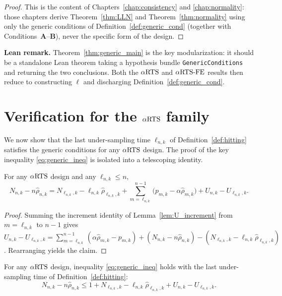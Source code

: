 \begin{proof}
This is the content of Chapters~\ref{chap:consistency} and \ref{chap:normality}:
those chapters derive Theorem~\ref{thm:LLN} and Theorem~\ref{thm:normality}
using only the generic conditions of Definition~\ref{def:generic_cond} (together
with Conditions~\textbf{A}--\textbf{B}), never the specific form of the design.
\end{proof}

\textbf{Lean remark.} Theorem~\ref{thm:generic_main} is the key modularization:
it should be a standalone Lean theorem taking a hypothesis bundle
\texttt{GenericConditions} and returning the two conclusions. Both the $\alpha\text{RTS}$
and $\alpha\text{RTS-FE}$ results then reduce to constructing $\ell$ and discharging
Definition~\ref{def:generic_cond}.

\section{Verification for the \texorpdfstring{$\alpha\text{RTS}$}{aRTS} family}
\label{sec:generic_verify}

We now show that the last under-sampling time $\ell_{n,k}$ of
Definition~\ref{def:hitting} satisfies the generic conditions for any $\alpha\text{RTS}$
design. The proof of the key inequality \eqref{eq:generic_ineq} is isolated into
a telescoping identity.

\begin{lemma}\label{lem:U_telescope}
\leanok
{}
For any $\alpha\text{RTS}$ design and any $\ell_{n,k} \le n$,
\[
  N_{n,k} - n\hat{\rho}_{n,k}
  = N_{\ell_{n,k},k} - \ell_{n,k}\hat{\rho}_{\ell_{n,k},k}
    + \sum_{m=\ell_{n,k}}^{n-1}\big(p_{m,k} - \alpha\hat{\rho}_{m,k}\big)
    + U_{n,k} - U_{\ell_{n,k},k}.
\]
\end{lemma}

\begin{proof}\leanok
{}
Summing the increment identity of Lemma~\ref{lem:U_increment} from
$m = \ell_{n,k}$ to $n-1$ gives
$U_{n,k} - U_{\ell_{n,k},k}
 = \sum_{m=\ell_{n,k}}^{n-1} (\alpha\hat{\rho}_{m,k} - p_{m,k})
   + (N_{n,k}-n\hat{\rho}_{n,k}) - (N_{\ell_{n,k},k}-\ell_{n,k}\hat{\rho}_{\ell_{n,k},k})$.
Rearranging yields the claim.
\end{proof}

\begin{lemma}\label{lem:preliminary_ineq}
\leanok
{}
For any $\alpha\text{RTS}$ design, inequality \eqref{eq:generic_ineq} holds with the last
under-sampling time of Definition~\ref{def:hitting}:
\[
  N_{n,k} - n\hat{\rho}_{n,k}
  \le 1 + N_{\ell_{n,k},k} - \ell_{n,k}\hat{\rho}_{\ell_{n,k},k}
    + U_{n,k} - U_{\ell_{n,k},k}.
\]
\end{lemma}


